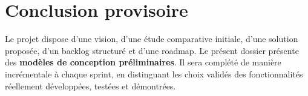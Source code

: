 \section{Conclusion provisoire}
Le projet dispose d’une vision, d’une étude comparative initiale, d’une solution proposée, d’un backlog structuré et d’une roadmap. Le présent dossier présente des \textbf{modèles de conception préliminaires}. Il sera complété de manière incrémentale à chaque sprint, en distinguant les choix validés des fonctionnalités réellement développées, testées et démontrées.
